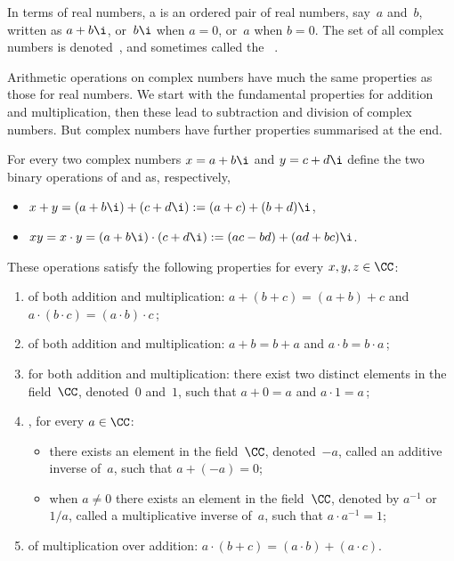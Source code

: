\begin{draft}
\begin{definition}\label{def:cc}
In terms of real numbers, a  is an ordered pair of real numbers, say~\(a\) and~\(b\), written as \(a+b\i\), or~\(b\i\) when \(a=0\), or~\(a\) when \(b=0\).
The set of all complex numbers is denoted~\CC, and sometimes called the ~\CC.
\end{definition}

Arithmetic operations on complex numbers have much the same properties as those for real numbers.
We start with the fundamental properties for addition and multiplication, then these lead to subtraction and division of complex numbers.
But complex numbers have further properties summarised at the end.


\begin{theorem} \label{def:ccfield}
For every two complex numbers \(x=a+b\i\) and \(y=c+d\i\) define 
the two binary operations of  and  
as, respectively,
\begin{itemize}
\item \(x+y=(a+b\i)+(c+d\i):=(a+c)+(b+d)\i\),
\item \(xy=x\cdot y=(a+b\i)\cdot(c+d\i):=(ac-bd)+(ad+bc)\i\).
\end{itemize}
These operations satisfy the following properties for every  \(x,y,z\in \CC\):
\begin{enumerate}
\item {} of both addition and multiplication: \(a + (b + c) = (a + b) + c\) and \(a \cdot (b \cdot c) = (a \cdot b) \cdot c\)\,;
\item {} of both addition and multiplication: \(a + b = b + a\) and \(a \cdot b = b \cdot a\)\,;
\item {} for both addition and multiplication: there exist two distinct elements in the field~\(\CC\), denoted~\(0\) and~\(1\), such that \(a + 0 = a\) and \(a \cdot 1 = a\)\,;
\item {}, for every \(a\in \CC\): 
\begin{itemize}
\item there exists an element in the field~\(\CC\), denoted~\(-a\), called an additive inverse of~\(a\), such that \(a + (-a) = 0\);
\item when \(a\neq 0\) there exists an element in the field~\(\CC\), denoted by \(a^{-1}\) or~\(1/a\), called a multiplicative inverse of~\(a\), such that \(a \cdot a^{-1} = 1\);
\end{itemize}
\item {} of multiplication over addition: \(a \cdot (b + c) = (a \cdot b) + (a \cdot c)\).
\end{enumerate}
\end{theorem}





\end{draft}

